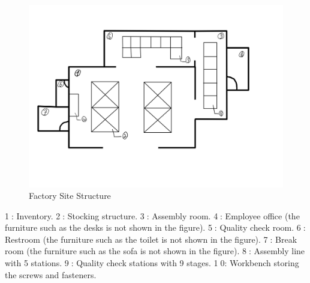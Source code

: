 \begin{figure}
    \centering
    \includegraphics[width=\textwidth]{images/factory.jpg}
    \caption{Factory Site Structure}
    \label{fig:factory_site_structure}
\end{figure}

\textcircled{1}: Inventory.
\textcircled{2}: Stocking structure.
\textcircled{3}: Assembly room.
\textcircled{4}: Employee office (the furniture such as the desks is not shown in the figure).
\textcircled{5}: Quality check room.
\textcircled{6}: Restroom (the furniture such as the toilet is not shown in the figure).
\textcircled{7}: Break room (the furniture such as the sofa is not shown in the figure).
\textcircled{8}: Assembly line with 5 stations.
\textcircled{9}: Quality check stations with 9 stages.
\textcircled{10}: Workbench storing the screws and fasteners.